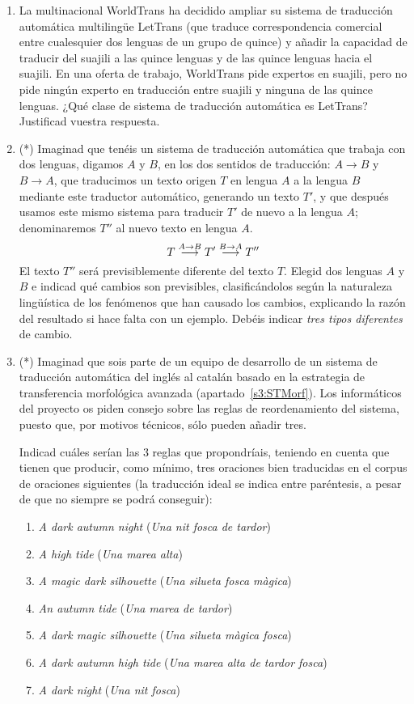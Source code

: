 \begin{enumerate}
\item La multinacional WorldTrans ha decidido ampliar su sistema de traducción automática multilingüe LetTrans (que traduce correspondencia comercial entre cualesquier dos lenguas de un grupo de quince) y añadir la capacidad de traducir del suajili a las quince lenguas y de las quince lenguas hacia el suajili. En una oferta de trabajo, WorldTrans pide expertos en suajili, pero no pide ningún experto en traducción entre suajili y ninguna de las quince lenguas. ¿Qué clase de sistema de traducción automática es LetTrans? Justificad vuestra respuesta. 

\item (*) Imaginad que tenéis un sistema de traducción automática que trabaja con dos lenguas, digamos $A$ y $B$, en los dos sentidos de traducción: $A{\rightarrow}B$ y $B{\rightarrow}A$, que traducimos un texto origen $T$ en lengua $A$ a la lengua $B$ mediante este traductor automático, generando un texto $T'$, y que después usamos este mismo sistema para traducir $T'$ de nuevo a la lengua $A$; denominaremos $T''$ al nuevo texto en lengua $A$. \begin{equation} T \stackrel{\scriptsize A\rightarrow B}{\longrightarrow}T'\stackrel{\scriptsize B\rightarrow A}{\longrightarrow} T'' \end{equation} El texto $T''$ será previsiblemente diferente del texto $T$. Elegid dos lenguas $A$ y $B$ e indicad qué cambios son previsibles, clasificándolos según la naturaleza lingüística de los fenómenos que han causado los cambios, explicando la razón del resultado si hace falta con un ejemplo. Debéis indicar \emph{tres tipos diferentes} de cambio. 

\item (*) Imaginad que sois parte de un equipo de desarrollo de un sistema de traducción automática del inglés al catalán basado en la estrategia de transferencia morfológica avanzada (apartado~\ref{s3:STMorf}). Los informáticos del proyecto os piden consejo sobre las reglas de reordenamiento del sistema, puesto que, por motivos técnicos, sólo pueden añadir tres. 

Indicad cuáles serían las 3 reglas que propondríais, teniendo en cuenta que tienen que producir, como mínimo, tres oraciones bien traducidas en el corpus de oraciones siguientes (la traducción ideal se indica entre paréntesis, a pesar de que no siempre se podrá conseguir): \begin{enumerate} \item \emph{A dark autumn night} (\emph{Una nit fosca de tardor}) \item \emph{A high tide} (\emph{Una marea alta}) \item \emph{A magic dark silhouette} (\emph{Una silueta fosca màgica}) \item \emph{An autumn tide} (\emph{Una marea de tardor}) \item \emph{A dark magic silhouette} (\emph{Una silueta màgica fosca}) \item \emph{A dark autumn high tide} (\emph{Una marea alta de tardor fosca}) \item \emph{A dark night} (\emph{Una nit fosca}) \end{enumerate} 


\end{enumerate}
